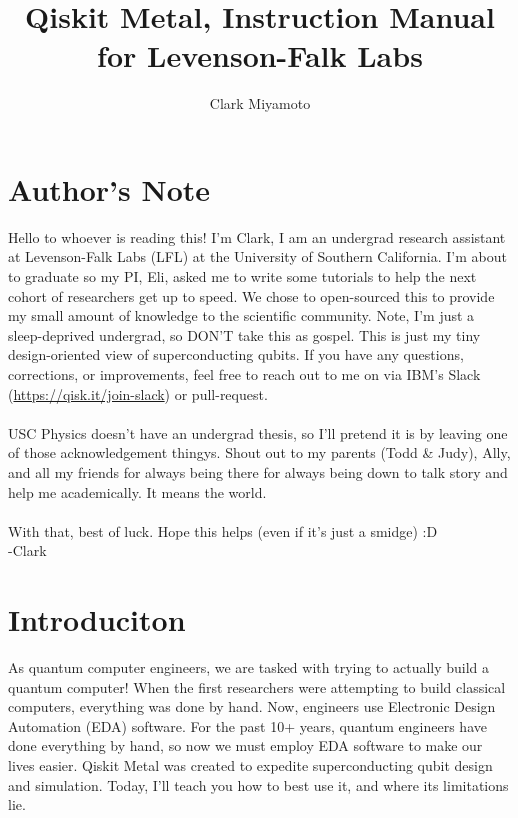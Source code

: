 \documentclass[11pt]{book}
\begin{document}
\title{Qiskit Metal, Instruction Manual for Levenson-Falk Labs}
\author{Clark Miyamoto}
\date{}

\maketitle

\section*{Author's Note}
Hello to whoever is reading this! I'm Clark, I am an undergrad research assistant at Levenson-Falk Labs (LFL) at the University of Southern California. I'm about to graduate so my PI, Eli, asked me to write some tutorials to help the next cohort of researchers get up to speed. We chose to open-sourced this to provide my small amount of knowledge to the scientific community.  Note, I'm just a sleep-deprived undergrad, so DON'T take this as gospel. This is just my tiny design-oriented view of superconducting qubits. If you have any questions, corrections, or improvements,  feel free to reach out to me on via IBM's Slack (\url{https://qisk.it/join-slack}) or pull-request.
\\
\\
USC Physics doesn't have an undergrad thesis, so I'll pretend it is by leaving one of those acknowledgement thingys.
 Shout out to my parents (Todd \& Judy), Ally, and all my friends for always being there for always being down to talk story and help me academically. It means the world.
\\
\\
With that, best of luck. Hope this helps (even if it's just a smidge) :D 
\\-Clark

\section*{Introduciton}

As quantum computer engineers, we are tasked with trying to actually build a quantum computer! When the first researchers were attempting to build classical computers, everything was done by hand. Now, engineers use Electronic Design Automation (EDA) software. For the past 10+ years, quantum engineers have done everything by hand, so now we must employ EDA software to make our lives easier. Qiskit Metal was created to expedite superconducting qubit design and simulation. Today, I'll teach you how to best use it, and where its limitations lie.
\end{document}
